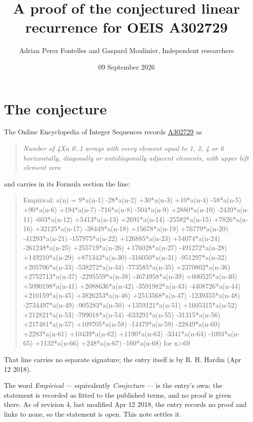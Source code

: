 \documentclass[11pt]{article}
\title{A proof of the conjectured linear recurrence for OEIS A302729}
\author{Adrian Perez Fontelles and Gaspard Moulinier, Independent researchers}
\date{09 September 2026}
\theoremstyle{definition}
\begin{document}
\maketitle
\section{The conjecture}

The Online Encyclopedia of Integer Sequences records \href{https://oeis.org/A302729}{A302729} as

\begin{quote}\itshape Number of 4Xn 0..1 arrays with every element equal to 1, 2, 4 or 6 horizontally, diagonally or antidiagonally adjacent elements, with upper left element zero\end{quote}

and carries in its Formula section the line:

\begin{quote}\ttfamily Empirical: a(n) = 9*a(n-1) -28*a(n-2) +30*a(n-3) +10*a(n-4) -58*a(n-5) +90*a(n-6) +194*a(n-7) -716*a(n-8) -504*a(n-9) +2880*a(n-10) -2439*a(n-11) -603*a(n-12) +5413*a(n-13) +2691*a(n-14) -25582*a(n-15) +7826*a(n-16) +32125*a(n-17) -38449*a(n-18) +15678*a(n-19) +76779*a(n-20) -41293*a(n-21) -157975*a(n-22) +126885*a(n-23) +54074*a(n-24) -261248*a(n-25) +255719*a(n-26) +176028*a(n-27) -491272*a(n-28) +149210*a(n-29) +871343*a(n-30) -316050*a(n-31) -951297*a(n-32) +205706*a(n-33) -538272*a(n-34) -773585*a(n-35) +2370802*a(n-36) +2752713*a(n-37) -2295559*a(n-38) -4674958*a(n-39) +600525*a(n-40) +5090198*a(n-41) +2088636*a(n-42) -3591982*a(n-43) -4408726*a(n-44) +210159*a(n-45) +3826253*a(n-46) +2513568*a(n-47) -1239355*a(n-48) -2734497*a(n-49) -905283*a(n-50) +1359121*a(n-51) +1605315*a(n-52) +212821*a(n-53) -799018*a(n-54) -633291*a(n-55) -31315*a(n-56) +217481*a(n-57) +109705*a(n-58) -14479*a(n-59) -22849*a(n-60) +2283*a(n-61) +10439*a(n-62) +1190*a(n-63) -3341*a(n-64) -1094*a(n-65) +1132*a(n-66) +248*a(n-67) -160*a(n-68) for n>69\end{quote}

That line carries no separate signature; the entry itself is by R. H. Hardin (Apr 12 2018).

The word {\itshape Empirical} --- equivalently {\itshape Conjecture} --- is the entry's own: the statement is recorded as fitted to the published terms, and no proof is given there. As of revision 4, last modified Apr 12 2018, the entry records no proof and links to none, so the statement is open. This note settles it.
\end{document}
